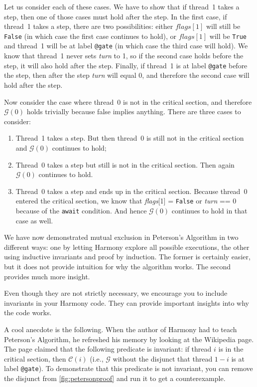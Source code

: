\documentclass{report}
\begin{document}
Let us consider each of these cases.
We have to show that if thread~1 takes a step, then one of those
cases must hold after the step.
In the first case, if thread~1 takes a step, there are two possibilities:
either $flags[1]$ will still be \texttt{False} (in which case the first case
continues to hold), or $flags[1]$ will be \texttt{True}
and thread~1 will be at label \texttt{@gate} (in which case the third case
will hold).
We know that thread~1 never sets \textit{turn} to 1, so
if the second case holds before the step, it will also hold after the step.
Finally, if thread~1 is at label \texttt{@gate} before the step, then after
the step \textit{turn} will equal 0, and therefore the second case will hold
after the step.

Now consider the case where thread~0 is not in the critical section,
and therefore $\mathcal{G}(0)$ holds trivially because false implies
anything.
There are three cases to consider:
\begin{enumerate}
\item Thread~1 takes a step.  But then thread~0 is still not in the critical
section and $\mathcal{G}(0)$ continues to hold;
\item Thread~0 takes a step but still is not in the critical section.
Then again $\mathcal{G}(0)$ continues to hold.
\item Thread~0 takes a step and ends up in the critical section.
Because thread~0 entered the critical section, we know that
\textit{flags}[1] = \texttt{False} or \textit{turn} == 0 because
of the \texttt{await} condition.
And hence $\mathcal{G}(0)$ continues to hold in that case as well.
\end{enumerate}

We have now demonstrated mutual exclusion in Peterson's Algorithm in two
different ways: one by letting Harmony explore all possible executions, the
other using inductive invariants and proof by induction.  The former
is certainly easier, but it does not provide intuition for why the
algorithm works.  The second provides much more insight.

Even though they are not strictly necessary, we encourage you
to include invariants in your Harmony code.
They can provide important insights into why the code works.

A cool anecdote is the following.  When the author of Harmony had to teach
Peterson's Algorithm, he refreshed his memory by looking at the Wikipedia
page.  The page claimed that the following predicate is invariant:
if thread $i$ is in the critical section, then $\mathcal{C}(i)$ (i.e.,
$\mathcal{G}$ without the disjunct that thread $1-i$ is at label \texttt{@gate}).
To demonstrate that this predicate is not invariant, you can remove the
disjunct from \autoref{fig:petersonproof} and run it to get a
counterexample.
\end{document}
